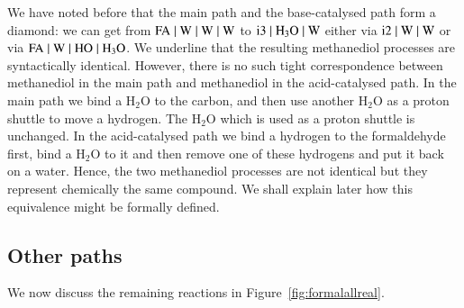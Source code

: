 We have noted before that the main path and the base-catalysed path form a diamond:
we can get from $\mathrm{FA \; \vert \; W \; \vert \; W \; \vert \; W}$ to $\mathrm{i3 \; \vert \; H_3O \; \vert \; W}$ either
via $\mathrm{i2 \; \vert \; W \; \vert \; W}$ or via $\mathrm{FA \; \vert \; W \; \vert \; HO \; \vert \; H_3O}$. We underline
that the resulting methanediol processes are syntactically identical.
However, there is no such tight correspondence between methanediol in the
main path and methanediol in the acid-catalysed path.
In the main path we bind a $\mathrm{H_2O}$ to the carbon, and then use another $\mathrm{H_2O}$ as a proton shuttle 
to move a hydrogen. The $\mathrm{H_2O}$ which is used as a proton shuttle is unchanged. 
In the acid-catalysed path we bind a hydrogen to the formaldehyde first, bind a $\mathrm{H_2O}$ to it 
and then remove one of these hydrogens and put it back on a water. 
Hence, the two methanediol processes are not identical but they represent chemically the same 
compound. We shall explain later how this equivalence might be formally defined.

\subsection{Other paths}
We now discuss the remaining reactions in Figure~\ref{fig:formalallreal}.

